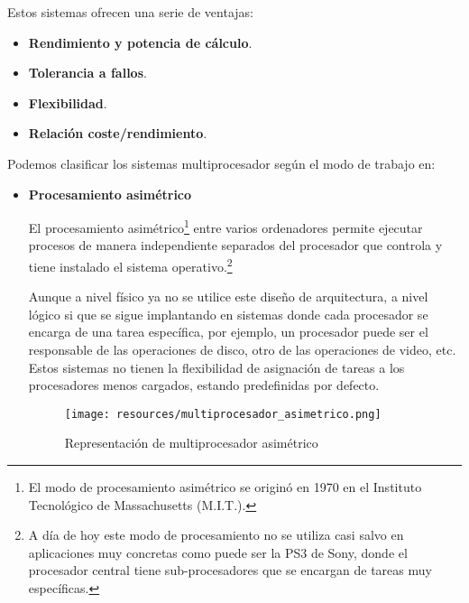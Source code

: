 \documentclass[a4paper, 11pt, titlepage]{article}
\begin{document}
        Estos sistemas ofrecen una serie de ventajas:

        \begin{itemize}
            \item \textbf{Rendimiento y potencia de cálculo}.
            \item \textbf{Tolerancia a fallos}.
            \item \textbf{Flexibilidad}.
            \item \textbf{Relación coste/rendimiento}.
        \end{itemize}

        Podemos clasificar los sistemas multiprocesador según el modo de trabajo en:

        \begin{itemize}
            \item \textbf{Procesamiento asimétrico}
            
            El procesamiento asimétrico\footnote{
                El modo de procesamiento asimétrico se originó en 1970 en el Instituto
                 Tecnológico de Massachusetts (M.I.T.). 
            } entre varios ordenadores permite ejecutar procesos 
            de manera independiente separados del procesador que controla y tiene instalado
            el sistema operativo.\footnote{
                A día de hoy este modo de procesamiento no se utiliza casi salvo en 
                aplicaciones muy concretas como puede ser la PS3 de Sony, donde el 
                procesador central tiene sub-procesadores que se encargan de tareas 
                muy específicas.
            }

            Aunque a nivel físico ya no se utilice este diseño de arquitectura, a nivel 
            lógico si que se sigue implantando en sistemas donde cada procesador se encarga
            de una tarea específica, por ejemplo, un procesador puede ser el responsable
            de las operaciones de disco, otro de las operaciones de video, etc. Estos
            sistemas no tienen la flexibilidad de asignación de tareas a los procesadores 
            menos cargados, estando predefinidas por defecto.

            \begin{figure}[htp]
                \centering
                \texttt{[image: resources/multiprocesador\_asimetrico.png]}
                \caption{Representación de multiprocesador asimétrico}
                \label{multiprocesador_asimetrico}
            \end{figure}


\end{itemize}
\end{document}
